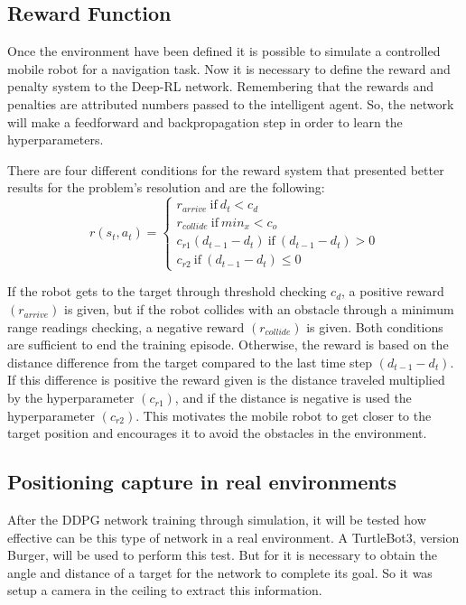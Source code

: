 \subsection*{Reward Function}

Once the environment have been defined it is possible to simulate a controlled mobile robot for a navigation task.
Now it is necessary to define the reward and penalty system to the Deep-RL network.
Remembering that the rewards and penalties are attributed numbers passed to the intelligent agent.
So, the network will make a feedforward and backpropagation step in order to learn the hyperparameters.

There are four different conditions for the reward system that presented better results for the problem's resolution and are the following:
\begin{equation}
r (s_t, a_t) = 
\begin{cases}
r_{arrive} \ \textrm{if} \ d_t < c_d
\\
r_{collide} \ \textrm{if}\ min_x < c_o
\\
c_{r1}(d_{t-1} - d_t) \ \textrm{if} \ (d_{t-1} - d_t) > 0
\\
c_{r2} \ \textrm{if} \ (d_{t-1} - d_t) \leq 0
\end{cases}
\end{equation}

If the robot gets to the target through threshold checking $c_d$, a positive reward $(r_{arrive})$ is given, but if the robot collides with an obstacle through a minimum range readings checking, a negative reward $(r_{collide})$ is given.
Both conditions are sufficient to end the training episode.
Otherwise, the reward is based on the distance difference from the target compared to the last time step $(d_{t-1} - d_t)$. 
If this difference is positive the reward given is the distance traveled multiplied by the hyperparameter $(c_{r1})$, and if the distance is negative is used the hyperparameter $(c_{r2})$.
This motivates the mobile robot to get closer to the target position and encourages it to avoid the obstacles in the environment.

\subsection*{Positioning capture in real environments}

After the DDPG network training through simulation, it will be tested how effective can be this type of network in a real environment.
A TurtleBot3, version Burger, will be used to perform this test.
But for it is necessary to obtain the angle and distance of a target for the network to complete its goal.
So it was setup a camera in the ceiling to extract this information.

